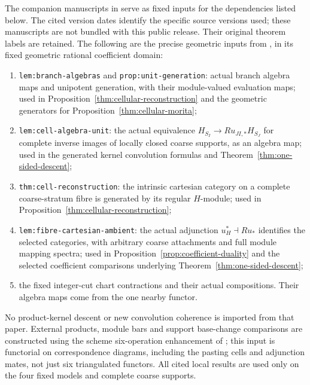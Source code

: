 \documentclass[11pt]{article}
\theoremstyle{definition}
\theoremstyle{remark}
\begin{document}
The companion manuscripts in \cite{Local,Refinement} serve as fixed
inputs for the dependencies listed below.  The cited version dates
identify the specific source versions used; these manuscripts are not
bundled with this public release.  Their original theorem labels are
retained.  The following are the precise geometric inputs
from \cite{Refinement}, in its fixed geometric rational coefficient domain:
\begin{enumerate}
\item \texttt{lem:branch-algebras} and
\texttt{prop:unit-generation}: actual branch algebra maps and
unipotent generation, with their module-valued evaluation maps;
used in Proposition~\ref{thm:cellular-reconstruction} and the geometric
generators for Proposition~\ref{thm:cellular-morita};
\item \texttt{lem:cell-algebra-unit}: the actual equivalence
$H_{S_I}\to Ru_{JI,*}H_{S_J}$ for complete inverse images of locally
closed coarse supports, as an algebra map; used in the generated
kernel convolution formulas and Theorem~\ref{thm:one-sided-descent};
\item \texttt{thm:cell-reconstruction}: the intrinsic cartesian
category on a complete coarse-stratum fibre is generated by its
regular $H$-module; used in Proposition~\ref{thm:cellular-reconstruction};
\item \texttt{lem:fibre-cartesian-ambient}: the actual adjunction
$u_H^*\dashv Ru_*$ identifies the selected categories, with arbitrary
coarse attachments and full module mapping spectra; used in
Proposition~\ref{prop:coefficient-duality} and the selected coefficient
comparisons underlying Theorem~\ref{thm:one-sided-descent};
\item the fixed integer-cut chart contractions and their actual
compositions.  Their algebra maps come from the one nearby functor.
\end{enumerate}
No product-kernel descent or new convolution coherence is imported
from that paper.  External products, module bars and support
base-change comparisons are constructed using the scheme six-operation
enhancement of \cite{LZEnhanced,LZAdic}; this input is functorial on
correspondence diagrams, including the pasting cells and adjunction
mates, not just six triangulated functors.  All cited local results
are used only on the four fixed models and complete coarse supports.
\end{document}
